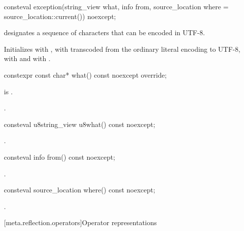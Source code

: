 %
\begin{itemdecl}
consteval exception(string_view what, info from,
                    source_location where = source_location::current()) noexcept;
\end{itemdecl}
\begin{itemdescr}
\pnum
\constantwhen
{} designates a sequence of characters
that can be encoded in UTF-8.

\pnum
\effects
Initializes
 with ,
 with 
transcoded from the ordinary literal encoding to UTF-8,
 with  and
 with .
\end{itemdescr}

%
\begin{itemdecl}
constexpr const char* what() const noexcept override;
\end{itemdecl}
\begin{itemdescr}
\pnum
\constantwhen
{} is .

\pnum
\returns
{}.
\end{itemdescr}

%
\begin{itemdecl}
consteval u8string_view u8what() const noexcept;
\end{itemdecl}
\begin{itemdescr}
\pnum
\returns
{}.
\end{itemdescr}

%
\begin{itemdecl}
consteval info from() const noexcept;
\end{itemdecl}
\begin{itemdescr}
\pnum
\returns
{}.
\end{itemdescr}

%
\begin{itemdecl}
consteval source_location where() const noexcept;
\end{itemdecl}
\begin{itemdescr}
\pnum
\returns
{}.
\end{itemdescr}

[meta.reflection.operators]{Operator representations}

